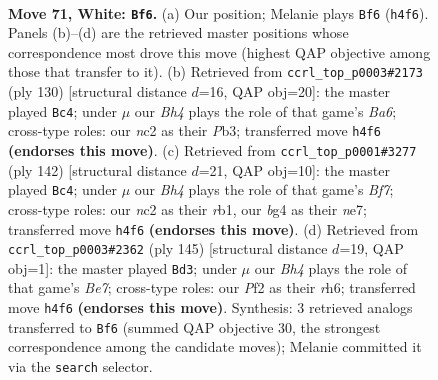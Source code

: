 \documentclass[11pt]{article}
\begin{document}
\clearpage

\begin{figure}[p]\centering
\begin{subfigure}{0.46\textwidth}\centering
\resizebox{\linewidth}{!}{%
\newchessgame
\chessboard[
  setfen={8/7k/8/8/r5bB/6R1/2n2P1K/8 w - - 2 71},
  showmover=false,
  pgfstyle=straightmove, color=movearrow, markmove={h4-f6}
]}
\caption{}
\end{subfigure}\hfill
\begin{subfigure}{0.46\textwidth}\centering
\resizebox{\linewidth}{!}{%
\newchessgame
\chessboard[
  setfen={8/8/B4k1p/8/5r2/1P6/4Rb1K/8 w - - 0 66},
  showmover=false,
  pgfstyle=straightmove, color=movearrow, markmove={a6-c4}
]}
\caption{}
\end{subfigure}
\\[4pt]
\begin{subfigure}{0.46\textwidth}\centering
\resizebox{\linewidth}{!}{%
\newchessgame
\chessboard[
  setfen={8/4nB2/3k4/6P1/4R3/5K2/8/1r6 w - - 7 72},
  showmover=false,
  pgfstyle=straightmove, color=movearrow, markmove={f7-c4}
]}
\caption{}
\end{subfigure}\hfill
\begin{subfigure}{0.46\textwidth}\centering
\resizebox{\linewidth}{!}{%
\newchessgame
\chessboard[
  setfen={8/3k4/3B3R/1r6/8/8/4b3/K7 b - - 5 73},
  showmover=false,
  pgfstyle=straightmove, color=movearrow, markmove={e2-d3}
]}
\caption{}
\end{subfigure}
\caption{\textbf{Move 71, White: \texttt{Bf6}.} (a) Our position; Melanie plays \texttt{Bf6} (\texttt{h4f6}). Panels (b)--(d) are the retrieved master positions whose correspondence most drove this move (highest QAP objective among those that transfer to it). (b) Retrieved from \texttt{ccrl\_top\_p0003\#2173} (ply 130) [structural distance $d$=16, QAP obj=20]: the master played \texttt{Bc4}; under $\mu$ our \emph{Bh4} plays the role of that game's \emph{Ba6}; cross-type roles: our \emph{n}c2 as their \emph{P}b3; transferred move \texttt{h4f6} \textbf{(endorses this move)}. (c) Retrieved from \texttt{ccrl\_top\_p0001\#3277} (ply 142) [structural distance $d$=21, QAP obj=10]: the master played \texttt{Bc4}; under $\mu$ our \emph{Bh4} plays the role of that game's \emph{Bf7}; cross-type roles: our \emph{n}c2 as their \emph{r}b1, our \emph{b}g4 as their \emph{n}e7; transferred move \texttt{h4f6} \textbf{(endorses this move)}. (d) Retrieved from \texttt{ccrl\_top\_p0003\#2362} (ply 145) [structural distance $d$=19, QAP obj=1]: the master played \texttt{Bd3}; under $\mu$ our \emph{Bh4} plays the role of that game's \emph{Be7}; cross-type roles: our \emph{P}f2 as their \emph{r}h6; transferred move \texttt{h4f6} \textbf{(endorses this move)}. Synthesis: 3 retrieved analogs transferred to \texttt{Bf6} (summed QAP objective 30, the strongest correspondence among the candidate moves); Melanie committed it via the \texttt{search} selector.}
\label{fig:thought-m140}
\end{figure}
\end{document}
